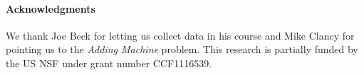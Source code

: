 \documentclass{sig-alternate-05-2015}
\def\problemName#1{\emph{#1}\xspace}
\def\Adding{\problemName{Adding Machine}}
\begin{document}
\paragraph{Acknowledgments}
We thank Joe Beck for letting us collect data in his course and Mike Clancy for pointing us to the \Adding problem. This research is partially funded by the US NSF under grant number CCF1116539.

\small

  
\end{document}
